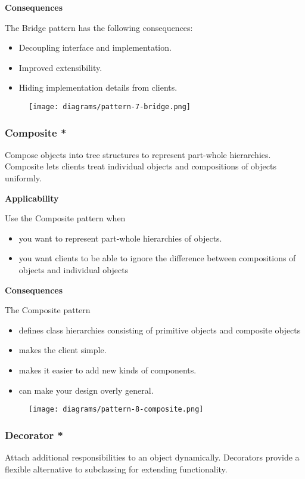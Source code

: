 \documentclass{article}
\begin{document}
\textbf{Consequences}

The Bridge pattern has the following consequences:

\begin{itemize}
    \item Decoupling interface and implementation.
    \item Improved extensibility. 
    \item Hiding implementation details from clients. 
\end{itemize}


\begin{figure}[h]
    \centering
    \texttt{[image: diagrams/pattern-7-bridge.png]}
\end{figure}

\newpage
\subsubsection{Composite *}
Compose objects into tree structures to represent part-whole hierarchies. Composite lets clients treat individual objects and compositions of objects
uniformly.

\textbf{Applicability}

Use the Composite pattern when
\begin{itemize}
    \item you want to represent part-whole hierarchies of objects.
    \item you want clients to be able to ignore the difference between compositions of objects and individual objects
\end{itemize}

\textbf{Consequences}

The Composite pattern
\begin{itemize}
    \item defines class hierarchies consisting of primitive objects and composite objects
    \item makes the client simple.
    \item makes it easier to add new kinds of components.
    \item can make your design overly general.
\end{itemize}

\begin{figure}[h]
    \centering
    \texttt{[image: diagrams/pattern-8-composite.png]}
\end{figure}

\newpage
\subsubsection{Decorator *}
Attach additional responsibilities to an object dynamically. Decorators
provide a flexible alternative to subclassing for extending functionality.
\end{document}
